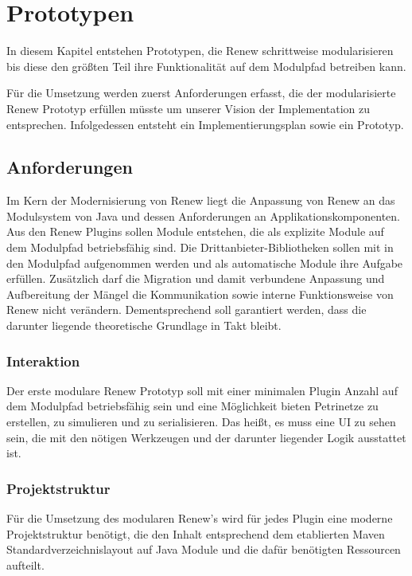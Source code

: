 \chapter{Prototypen} 
In diesem Kapitel entstehen Prototypen, die Renew schrittweise modularisieren bis diese den größten Teil ihre Funktionalität auf dem Modulpfad betreiben kann. 


Für die Umsetzung werden zuerst Anforderungen erfasst, die der modularisierte Renew Prototyp erfüllen müsste um unserer Vision der Implementation zu entsprechen. Infolgedessen entsteht ein Implementierungsplan sowie ein Prototyp. 

\section{Anforderungen} \label{sec:anforderungen}
Im Kern der Modernisierung von Renew liegt die Anpassung von Renew an das Modulsystem von Java und dessen Anforderungen an Applikationskomponenten. Aus den Renew Plugins sollen Module entstehen, die als explizite Module auf dem Modulpfad betriebsfähig sind. Die Drittanbieter-Bibliotheken sollen mit in den Modulpfad aufgenommen werden und als automatische Module ihre Aufgabe erfüllen. Zusätzlich darf die Migration und damit verbundene Anpassung und Aufbereitung der Mängel die Kommunikation sowie interne Funktionsweise von Renew nicht verändern. Dementsprechend soll garantiert werden, dass die darunter liegende theoretische Grundlage in Takt bleibt. 

\subsection{Interaktion}
Der erste modulare Renew Prototyp soll mit einer minimalen Plugin Anzahl auf dem Modulpfad betriebsfähig sein und eine Möglichkeit bieten Petrinetze zu erstellen, zu simulieren und zu serialisieren. Das heißt, es muss eine UI zu sehen sein, die mit den nötigen Werkzeugen und der darunter liegender Logik ausstattet ist. 

\subsection{Projektstruktur}
Für die Umsetzung des modularen Renew's wird für jedes Plugin eine moderne Projektstruktur benötigt, die den Inhalt entsprechend dem etablierten Maven Standardverzeichnislayout auf Java Module und die dafür benötigten Ressourcen aufteilt. 

